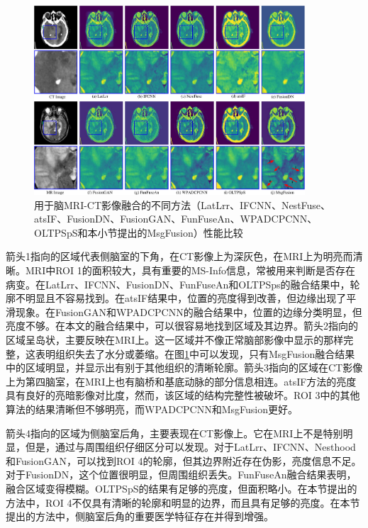     \begin{figure}[ht]
      \centering
          \includegraphics[width=0.9\textwidth]{figs/paper1cmd010roi.pdf}
          \caption{用于脑MRI-CT影像融合的不同方法（LatLrr、IFCNN、NestFuse、atsIF、FusionDN、FusionGAN、FunFuseAn、WPADCPCNN、OLTPSpS和本小节提出的MsgFusion）性能比较}\label{paper1cmd010roi}
     \end{figure}

箭头1指向的区域代表侧脑室的下角，在CT影像上为深灰色，在MRI上为明亮而清晰。MRI中ROI 1的面积较大，具有重要的MS-Info信息，常被用来判断是否存在病变。在LatLrr、IFCNN、FusionDN、FunFuseAn和OLTPSps的融合结果中，轮廓不明显且不容易找到。在atsIF结果中，位置的亮度得到改善，但边缘出现了平滑现象。在FusionGAN和WPADCPCNN的融合结果中，位置的边缘分类明显，但亮度不够。在本文的融合结果中，可以很容易地找到区域及其边界。箭头2指向的区域呈岛状，主要反映在MRI上。这一区域并不像正常脑部影像中显示的那样完整，这表明组织失去了水分或萎缩。在图\ref{paper1cmd010roi}中可以发现，只有MsgFusion融合结果中的区域明显，并显示出有别于其他组织的清晰轮廓。箭头3指向的区域在CT影像上为第四脑室，在MRI上也有脑桥和基底动脉的部分信息相连。atsIF方法的亮度具有良好的亮暗影像对比度，然而，该区域的结构完整性被破坏。ROI 3中的其他算法的结果清晰但不够明亮，而WPADCPCNN和MsgFusion更好。

箭头4指向的区域为侧脑室后角，主要表现在CT影像上。它在MRI上不是特别明显，但是，通过与周围组织仔细区分可以发现。对于LatLrr、IFCNN、Nesthood和FusionGAN，可以找到ROI 4的轮廓，但其边界附近存在伪影，亮度信息不足。对于FusionDN，这个位置很明显，但周围组织丢失。FunFuseAn融合结果表明，融合区域变得模糊。OLTPSpS的结果有足够的亮度，但面积略小。在本节提出的方法中，ROI 4不仅具有清晰的轮廓和明显的边界，而且具有足够的亮度。在本节提出的方法中，侧脑室后角的重要医学特征存在并得到增强。

